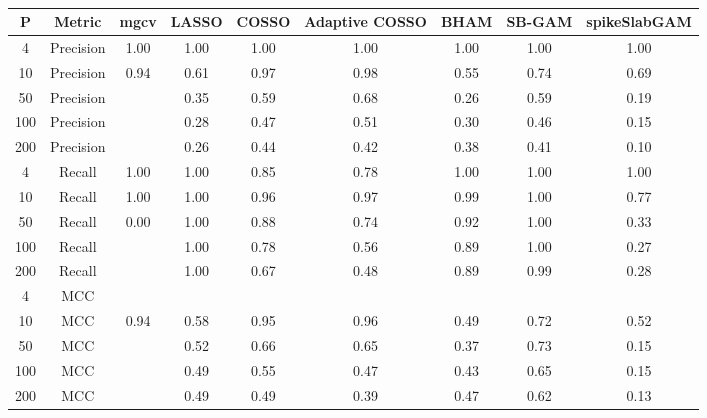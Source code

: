 \begin{table}[ht]
\centering
\begin{tabular}{ccccccccc}
  \hline
P & Metric & mgcv & LASSO & COSSO & Adaptive COSSO & BHAM & SB-GAM & spikeSlabGAM \\ 
  \hline
  4 & Precision & 1.00 & 1.00 & 1.00 & 1.00 & 1.00 & 1.00 & 1.00 \\ 
   10 & Precision & 0.94 & 0.61 & 0.97 & 0.98 & 0.55 & 0.74 & 0.69 \\ 
   50 & Precision &  & 0.35 & 0.59 & 0.68 & 0.26 & 0.59 & 0.19 \\ 
  100 & Precision &  & 0.28 & 0.47 & 0.51 & 0.30 & 0.46 & 0.15 \\ 
  200 & Precision &  & 0.26 & 0.44 & 0.42 & 0.38 & 0.41 & 0.10 \\ 
    4 & Recall & 1.00 & 1.00 & 0.85 & 0.78 & 1.00 & 1.00 & 1.00 \\ 
   10 & Recall & 1.00 & 1.00 & 0.96 & 0.97 & 0.99 & 1.00 & 0.77 \\ 
   50 & Recall & 0.00 & 1.00 & 0.88 & 0.74 & 0.92 & 1.00 & 0.33 \\ 
  100 & Recall &  & 1.00 & 0.78 & 0.56 & 0.89 & 1.00 & 0.27 \\ 
  200 & Recall &  & 1.00 & 0.67 & 0.48 & 0.89 & 0.99 & 0.28 \\ 
    4 & MCC &  &  &  &  &  &  &  \\ 
   10 & MCC & 0.94 & 0.58 & 0.95 & 0.96 & 0.49 & 0.72 & 0.52 \\ 
   50 & MCC &  & 0.52 & 0.66 & 0.65 & 0.37 & 0.73 & 0.15 \\ 
  100 & MCC &  & 0.49 & 0.55 & 0.47 & 0.43 & 0.65 & 0.15 \\ 
  200 & MCC &  & 0.49 & 0.49 & 0.39 & 0.47 & 0.62 & 0.13 \\ 
   \hline
\end{tabular}
\caption{} 
\label{}
\end{table}
